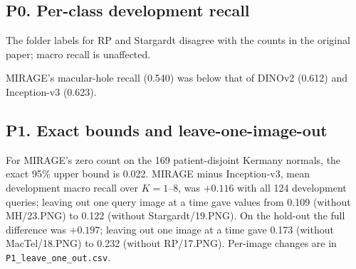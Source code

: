 \subsection*{P0. Per-class development recall}
\begin{table}[!htbp]
\caption{Post hoc, rule fixed after first look (first computed 15 Nov 2026). Recall per class on the development images, prototype classifier, mean over $K=1$--8 and 100 draws.}
\label{tab:p0}
\centering\footnotesize

\par\smallskip
\parbox{0.6\textwidth}{\footnotesize \fnRS The folder labels for RP and Stargardt disagree with the counts in the original paper; macro recall is unaffected.}
\end{table}
MIRAGE's macular-hole recall (0.540) was below that of DINOv2 (0.612) and Inception-v3 (0.623).

\subsection*{P1. Exact bounds and leave-one-image-out}
\begin{table}[!htbp]
\caption{Post hoc, rule committed 16 Nov 2026. Clopper--Pearson 95\% bounds for nine-way counts of scans called any rare class. OCTDL counts are clustered (332 normal images from 110 patients; 39 MH images from 28 patients), and the exact bound treats images as independent. Every other nine-way count (correct class, called NORMAL, called a common disease) has its bounds in \texttt{P1\_nine\_way\_exact\_bounds.csv} (released).}
\label{tab:p1}
\centering\footnotesize

\end{table}
For MIRAGE's zero count on the 169 patient-disjoint Kermany normals, the exact 95\% upper bound is 0.022. MIRAGE minus Inception-v3, mean development macro recall over $K=1$--8, was $+0.116$ with all 124 development queries; leaving out one query image at a time gave values from 0.109 (without MH/23.PNG) to 0.122 (without Stargardt/19.PNG). On the hold-out the full difference was $+0.197$; leaving out one image at a time gave 0.173 (without MacTel/18.PNG) to 0.232 (without RP/17.PNG). Per-image changes are in \texttt{P1\_leave\_one\_out.csv}.

